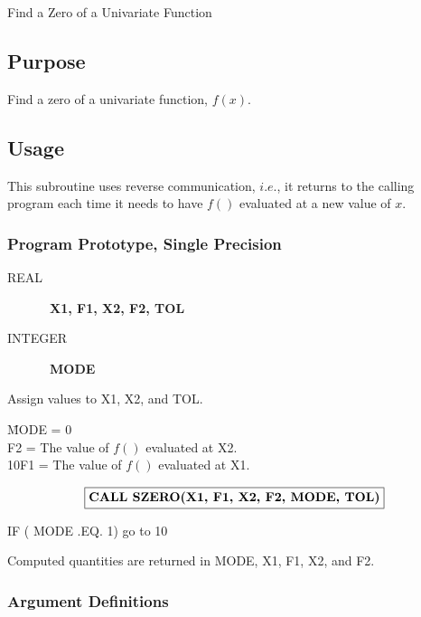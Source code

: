 \documentclass[twoside]{MATH77}
\begin{document}
  Find a Zero of a Univariate Function


\subsection{Purpose}

Find a zero of a univariate function, $f(x).$

\subsection{Usage}

This subroutine uses reverse communication, $i.e.$, it returns to the
calling program each time it needs to have $f()$ evaluated at a new value of
$x.$

\subsubsection{Program Prototype, Single Precision}
\begin{description}
\item[REAL] \ {\bf X1, F1, X2, F2, TOL}
\item[INTEGER] \ {\bf MODE}
\end{description}
Assign values to X1, X2, and TOL.
\begin{tabbing}
\hspace{.2in}\=MODE = 0\\
\>F2 = The value of $f()$ evaluated at X2.\\
10\>F1 = The value of $f()$ evaluated at X1.
\end{tabbing}\vspace{-2pt}
$$
\fbox{\bf CALL SZERO(X1, F1, X2, F2, MODE, TOL)}
$$
\begin{tabbing}
\hspace{.2in}IF ( MODE .EQ. 1) go to 10
\end{tabbing}
Computed quantities are returned in MODE, X1, F1, X2, and F2.

\subsubsection{Argument Definitions}
\end{document}
